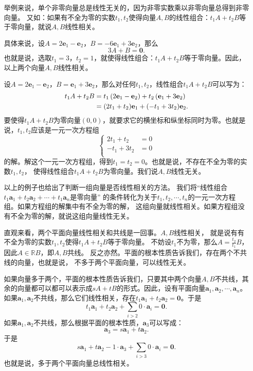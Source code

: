 \documentclass[12pt,UTF8]{ctexbook}
\begin{document}
举例来说，单个非零向量总是线性无关的，因为非零实数乘以非零向量总得到非零向量。
又如：如果有不全为零的实数$t_1,t_2$使得向量$A, B$的线性组合：$t_1A + t_2B$等于零向量，就说$A, B$线性相关。

具体来说，设$A = 2\mathbf{e}_1 - \mathbf{e}_2$，$B = -6\mathbf{e}_1 + 3 \mathbf{e}_2$，那么
$$3A + B = \mathbf{0}.$$
也就是说，选取$t_1 = 3$，$t_2 = 1$，就使得线性组合：$t_1A + t_2B$等于零向量。因此，以上两个向量$A, B$线性相关。

设$A = 2\mathbf{e}_1 - \mathbf{e}_2$，$B = \mathbf{e}_1 + 3 \mathbf{e}_2$，那么对任何$t_1,t_2$，线性组合$t_1A + t_2B$可以写为：
\begin{align}
t_1A + t_2B &= t_1 \left( 2\mathbf{e}_1 - \mathbf{e}_2 \right) + t_2 \left( \mathbf{e}_1 + 3 \mathbf{e}_2 \right) \notag \\
&= (2t_1 + t_2) \mathbf{e}_1 + (-t_1 + 3t_2)\mathbf{e}_2.\notag
\end{align}
要使得$t_1A + t_2B$为零向量$(0,0)$，就要求它的横坐标和纵坐标同时为零。也就是说，$t_1,t_2$应该是一元一次方程组
$$
\left\{
\begin{array}{cl}
  2t_1 + t_2 &= 0 \\
  -t_1 +3t_2 &= 0 \\
\end{array}
\right.
$$
的解。解这个一元一次方程组，得到$t_1=t_2=0$。也就是说，不存在不全为零的实数$t_1, t_2$，
使得线性组合$t_1A + t_2B$为零向量。我们说$A, B$线性无关。

以上的例子也给出了判断一组向量是否线性相关的方法。
我们将“线性组合$t_1\mathbf{a}_1 + t_2\mathbf{a}_2 + \cdots + t_1\mathbf{a}_n$是零向量”
的条件转化为关于$t_1, t_2, \cdots , t_n$的一元一次方程组。如果方程组的解集中有不全为零的解，
这组向量就线性相关。如果方程组没有不全为零的解，就说这组向量线性无关。

直观来看，两个平面向量线性相关和共线是一回事。$A, B$线性相关，
就是说有有不全为零的实数$t_1,t_2$使得$t_1A + t_2B$等于零向量。
不妨设$t_1$不为零，那么$A = \frac{t_2}{t_1}B$，因此$A\in\mathbb{R}B$，即$A, B$共线。
反之亦然。平面的根本性质告诉我们，存在两个不共线的向量，也就是说，
不多于两个平面向量，可以线性无关。

如果向量多于两个，平面的根本性质告诉我们，只要其中两个向量$A, B$不共线，其余的向量都可以都可以表示成$sA + tB$的形式。因此，设有平面向量$\mathbf{a}_1, \mathbf{a}_2, \cdots , \mathbf{a}_n$。如果$\mathbf{a}_1, \mathbf{a}_2$不共线，那么它们线性相关，存在$t_1\mathbf{a}_1 + t_2\mathbf{a}_2 = \mathbf{0}$。于是
$$t_1\mathbf{a}_1 + t_2\mathbf{a}_2 + \sum_{i>2}0\cdot\mathbf{a}_i = \mathbf{0}.$$
如果$\mathbf{a}_1, \mathbf{a}_2$不共线，那么根据平面的根本性质，$\mathbf{a}_3$可以写成：
$$ \mathbf{a}_3 = s\mathbf{a}_1 + t\mathbf{a}_2.$$
于是
$$s\mathbf{a}_1 + t\mathbf{a}_2 - 1\cdot\mathbf{a}_3 + \sum_{i>3}0\cdot\mathbf{a}_i = \mathbf{0}.$$
也就是说，多于两个平面向量总线性相关。
\end{document}
